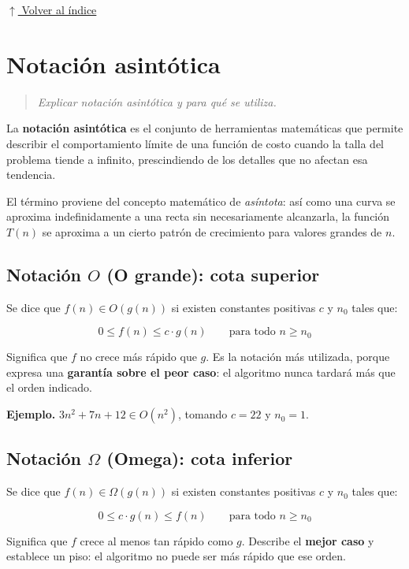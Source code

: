\documentclass[12pt]{article}
\newcommand{\volverindice}{%
    \vspace{1em}%
    \begin{flushright}%
        \hyperlink{indice}{\small $\uparrow$ Volver al índice}%
    \end{flushright}%
}
\newcommand{\enunciado}[1]{%
    \begin{quote}
        \itshape #1
    \end{quote}
}
\begin{document}
\volverindice
\newpage


\section{Notación asintótica}

\enunciado{Explicar notación asintótica y para qué se utiliza.}

La \textbf{notación asintótica} es el conjunto de herramientas matemáticas que permite describir el comportamiento límite de una función de costo cuando la talla del problema tiende a infinito, prescindiendo de los detalles que no afectan esa tendencia.

El término proviene del concepto matemático de \emph{asíntota}: así como una curva se aproxima indefinidamente a una recta sin necesariamente alcanzarla, la función $T(n)$ se aproxima a un cierto patrón de crecimiento para valores grandes de $n$.

\subsection{Notación $O$ (O grande): cota superior}

Se dice que $f(n) \in O(g(n))$ si existen constantes positivas $c$ y $n_0$ tales que:

\[
0 \le f(n) \le c \cdot g(n) \qquad \text{para todo } n \ge n_0
\]

Significa que $f$ no crece más rápido que $g$. Es la notación más utilizada, porque expresa una \textbf{garantía sobre el peor caso}: el algoritmo nunca tardará más que el orden indicado.

\textbf{Ejemplo.} $3n^2 + 7n + 12 \in O(n^2)$, tomando $c = 22$ y $n_0 = 1$.

\subsection{Notación $\Omega$ (Omega): cota inferior}

Se dice que $f(n) \in \Omega(g(n))$ si existen constantes positivas $c$ y $n_0$ tales que:

\[
0 \le c \cdot g(n) \le f(n) \qquad \text{para todo } n \ge n_0
\]

Significa que $f$ crece al menos tan rápido como $g$. Describe el \textbf{mejor caso} y establece un piso: el algoritmo no puede ser más rápido que ese orden.
\end{document}
